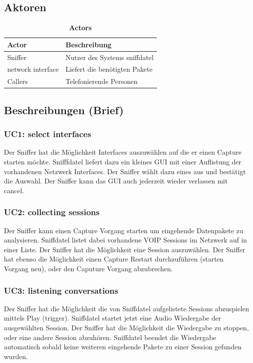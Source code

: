\documentclass[a4,12pt]{scrartcl}
\begin{document}
\subsection{Aktoren}
\begin{table}[H]
\centering
    \begin{tabular}{@{} l l@{}}    
    {Actor} & {Beschreibung}\\ \midrule
    Sniffer & Nutzer des Systems sniffdatel\\ \addlinespace
    network interface & Liefert die benötigten Pakete\\ \addlinespace
    Callers & Telefonierende Personen\\ \bottomrule
    \end{tabular}
\caption{\textbf{Actors}}
\end{table} 

\subsection{Beschreibungen (Brief)	}
\subsubsection{UC1: select interfaces}
Der Sniffer hat die Möglichkeit Interfaces auszuwählen auf die er einen Capture starten möchte. Snifffdatel liefert dazu ein kleines GUI mit einer Auflistung der vorhandenen Netzwerk Interfaces. Der Sniffer wählt dazu eines aus und bestätigt die Auswahl. Der Sniffer kann das GUI auch jederzeit wieder verlassen mit cancel. 
\subsubsection{UC2: collecting sessions}
Der Sniffer kann einen Capture Vorgang starten um eingehende Datenpakete zu analysieren. Sniffdatel listet dabei vorhandene VOIP Sessions im Netzwerk auf in einer Liste. Der Sniffer hat die Möglichkeit eine Session auszuwählen. Der Sniffer hat ebenso die Möglichkeit einen Capture Restart durchzuführen (starten Vorgang neu), oder den Caputure Vorgang abzubrechen. 
\subsubsection{UC3: listening conversations}
Der Sniffer hat die Möglichkeit die von Sniffdatel aufgelistete Sessions abzuspielen mittels Play (trigger). Sniffdatel startet jetzt eine Audio Wiedergabe der ausgewählten Session. Der Sniffer hat die Möglichkeit die Wiedergabe zu stoppen, oder eine andere Session abzuhören. Sniffdatel beendet die Wiedergabe automatisch sobald keine weiteren eingehende Pakete zu einer Session gefunden wurden. 
\end{document}
